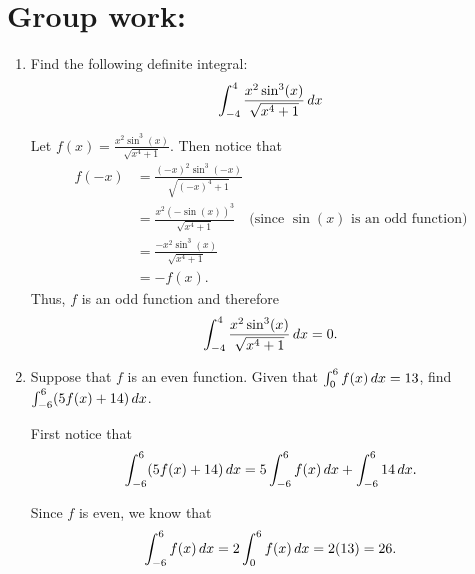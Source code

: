 \documentclass[handout,nooutcomes]{ximera}
\begin{document}
		
		

	
	
	
	
	

\section*{Group work:}



\begin{problem}
	\begin{enumerate}
	
	\item  Find the following definite integral:
	\begin{equation*}
	\int_{-4}^4 \frac{x^2 \sin^3(x)}{\sqrt{x^4 + 1}} \,d x
	\end{equation*}
		\begin{freeResponse}
		Let $f(x) = \frac{x^2 \sin^3(x)}{\sqrt{x^4 + 1}}$.  
		Then notice that
			\begin{align*}
			f(-x) &= \frac{(-x)^2 \sin^3(-x)}{\sqrt{(-x)^4 + 1}}  \\
			&= \frac{x^2 (- \sin(x))^3}{\sqrt{x^4 + 1}}  \quad \text{(since } \sin(x) \text{ is an odd function)}  \\
			&= \frac{- x^2 \sin^3(x)}{\sqrt{x^4 + 1}}  \\
			&= -f(x).
			\end{align*}
		Thus, $f$ is an odd function and therefore
			\begin{equation*}
			\int_{-4}^4 \frac{x^2 \sin^3(x)}{\sqrt{x^4 + 1}} \,d x = 0.
			\end{equation*}
		\end{freeResponse}
		
		
		
	\item  Suppose that $f$ is an even function.  Given that $\int_0^6 f(x) \,d x = 13$, find $\int_{-6}^6 (5f(x) + 14) \,d x$.
		\begin{freeResponse}
		First notice that
			\begin{equation}\label{linear integral}
			\int_{-6}^6 (5f(x) + 14) \,d x = 5 \int_{-6}^6 f(x) \,d x + \int_{-6}^6 14 \,d x.
			\end{equation}
			
		Since $f$ is even, we know that
			\begin{equation}\label{int of f}
			\int_{-6}^6 f(x) \,d x = 2 \int_0^6 f(x) \,d x = 2 (13) = 26.
			\end{equation}
			

\end{freeResponse}
\end{enumerate}
\end{problem}
\end{document}
